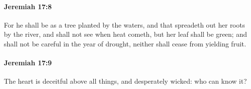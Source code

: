 		\paragraph{Jeremiah 17:8} %
			\label{JEREMIAH-17-8}

			For he shall be as a tree planted by the waters, and that spreadeth out her roots by the river, and shall not see when heat cometh, but her leaf shall be green; and shall not be careful in the year of drought, neither shall cease from yielding fruit.


		\paragraph{Jeremiah 17:9} %
			\label{JEREMIAH-17-9}

			The heart is deceitful above all things, and desperately wicked: who can know it?


